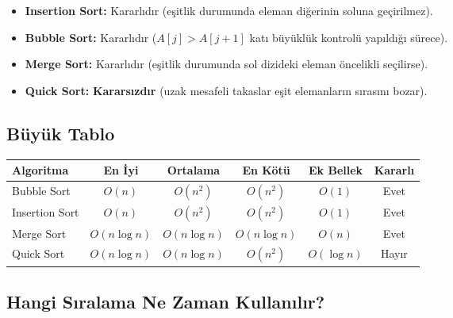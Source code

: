 \begin{itemize}
    \item \textbf{Insertion Sort:} Kararlıdır (eşitlik durumunda eleman diğerinin soluna geçirilmez).
    \item \textbf{Bubble Sort:} Kararlıdır ($A[j] > A[j+1]$ katı büyüklük kontrolü yapıldığı sürece).
    \item \textbf{Merge Sort:} Kararlıdır (eşitlik durumunda sol dizideki eleman öncelikli seçilirse).
    \item \textbf{Quick Sort:} \textbf{Kararsızdır} (uzak mesafeli takaslar eşit elemanların sırasını bozar).
\end{itemize}

\subsection{Büyük Tablo}

\begin{center}
\begin{small}\begin{tabular}{|l|c|c|c|c|c|}
\hline
\textbf{Algoritma} & \textbf{En İyi} & \textbf{Ortalama} & \textbf{En Kötü} & \textbf{Ek Bellek} & \textbf{Kararlı} \\
\hline
Bubble Sort & $O(n)$ & $O(n^2)$ & $O(n^2)$ & $O(1)$ & Evet \\
Insertion Sort & $O(n)$ & $O(n^2)$ & $O(n^2)$ & $O(1)$ & Evet \\
Merge Sort & $O(n \log n)$ & $O(n \log n)$ & $O(n \log n)$ & $O(n)$ & Evet \\
Quick Sort & $O(n \log n)$ & $O(n \log n)$ & $O(n^2)$ & $O(\log n)$ & Hayır \\
\hline
\end{tabular}\end{small}
\end{center}

\subsection{Hangi Sıralama Ne Zaman Kullanılır?}

